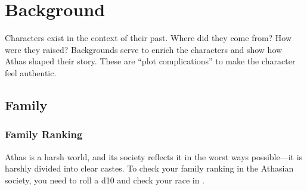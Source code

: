 \clearpage
\section{Background}
Characters exist in the context of their past. Where did they come from? How were they raised? Backgrounds serve to enrich the characters and show how Athas shaped their story. These are ``plot complications'' to make the character feel authentic.

\subsection{Family}

\subsubsection{Family Ranking}
Athas is a harsh world, and its society reflects it in the worst ways possible---it is harshly divided into clear castes. To check your family ranking in the Athasian society, you need to roll a d10 and check your race in .

